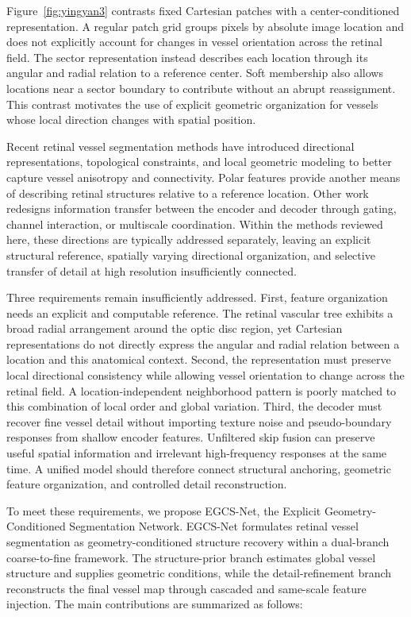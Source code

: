 \documentclass[a4paper,fleqn]{cas-sc}
\begin{document}
Figure~\ref{fig:yingyan3} contrasts fixed Cartesian patches with a center-conditioned representation.
A regular patch grid groups pixels by absolute image location and does not explicitly account for changes in vessel orientation across the retinal field.
The sector representation instead describes each location through its angular and radial relation to a reference center.
Soft membership also allows locations near a sector boundary to contribute without an abrupt reassignment.
This contrast motivates the use of explicit geometric organization for vessels whose local direction changes with spatial position.

Recent retinal vessel segmentation methods have introduced directional representations, topological constraints, and local geometric modeling to better capture vessel anisotropy and connectivity\cite{qiu2024gke,li2025direction,wei2023orientation}.
Polar features provide another means of describing retinal structures relative to a reference location\cite{rezatofighi2009polar}.
Other work redesigns information transfer between the encoder and decoder through gating, channel interaction, or multiscale coordination\cite{wang2022uctransnet,peng2025u}.
Within the methods reviewed here, these directions are typically addressed separately, leaving an explicit structural reference, spatially varying directional organization, and selective transfer of detail at high resolution insufficiently connected.

Three requirements remain insufficiently addressed.
First, feature organization needs an explicit and computable reference.
The retinal vascular tree exhibits a broad radial arrangement around the optic disc region, yet Cartesian representations do not directly express the angular and radial relation between a location and this anatomical context.
Second, the representation must preserve local directional consistency while allowing vessel orientation to change across the retinal field.
A location-independent neighborhood pattern is poorly matched to this combination of local order and global variation.
Third, the decoder must recover fine vessel detail without importing texture noise and pseudo-boundary responses from shallow encoder features.
Unfiltered skip fusion can preserve useful spatial information and irrelevant high-frequency responses at the same time.
A unified model should therefore connect structural anchoring, geometric feature organization, and controlled detail reconstruction.

To meet these requirements, we propose EGCS-Net, the Explicit Geometry-Conditioned Segmentation Network.
EGCS-Net formulates retinal vessel segmentation as geometry-conditioned structure recovery within a dual-branch coarse-to-fine framework.
The structure-prior branch estimates global vessel structure and supplies geometric conditions, while the detail-refinement branch reconstructs the final vessel map through cascaded and same-scale feature injection.
The main contributions are summarized as follows:
\end{document}
